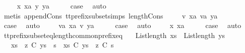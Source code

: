 \begin{isabellebody}
\isamarkupfalse%
\isanewline
\ \ \isamarkupfalse%
\ {\isacharparenleft}{}\ x\ xa\ y\ ya{\isacharparenright}\isanewline
\ \ \isamarkupfalse%
\ \isamarkupfalse%
\ {\isacharquery}case\ \isamarkupfalse%
\ auto\isanewline
\ \ \ \ \isamarkupfalse%
\ {\isacharparenleft}metis\ append{\isacharunderscore}Cons\ tt{\isacharunderscore}prefix{\isacharunderscore}subset{\isachardot}simps{\isacharparenleft}{}{\isacharparenright}\ length{\isacharunderscore}Cons{\isacharparenright}\isanewline
{}\isamarkupfalse%
\isanewline
\ \ \isamarkupfalse%
\ {\isacharparenleft}{\isachardoublequoteopen}{}{\isacharunderscore}{}{\isachardoublequoteclose}\ v\ xa\ va\ ya{\isacharparenright}\isanewline
\ \ \isamarkupfalse%
\ \isamarkupfalse%
\ {\isacharquery}case\ \isamarkupfalse%
\ auto\isanewline
{}\isamarkupfalse%
\isanewline
\ \ \isamarkupfalse%
\ {\isacharparenleft}{\isachardoublequoteopen}{}{\isacharunderscore}{}{\isachardoublequoteclose}\ va\ xa\ v\ ya{\isacharparenright}\isanewline
\ \ \isamarkupfalse%
\ \isamarkupfalse%
\ {\isacharquery}case\ \isamarkupfalse%
\ auto\isanewline
{}\isamarkupfalse%
\isanewline
\ \ \isamarkupfalse%
\ {\isacharparenleft}{}\ x\ xa{\isacharparenright}\isanewline
\ \ \isamarkupfalse%
\ \isamarkupfalse%
\ {\isacharquery}case\ \isamarkupfalse%
\ auto\isanewline
{}\isamarkupfalse%
%
\endisatagproof
{\isafoldproof}%
%
\isadelimproof
\isanewline
%
\endisadelimproof
\isanewline
{}\isamarkupfalse%
\ tt{\isacharunderscore}prefix{\isacharunderscore}subset{\isacharunderscore}eq{\isacharunderscore}length{\isacharunderscore}common{\isacharunderscore}prefix{\isacharunderscore}eq{\isacharcolon}\isanewline
\ \ \ {\isachardoublequoteopen}List{\isachardot}length\ xs\ {\isacharequal}\ List{\isachardot}length\ ys{\isachardoublequoteclose}\isanewline
\ \ \ {\isachardoublequoteopen}{\isacharparenleft}{\isacharparenleft}xs\ {\isacharat}\ z{\isacharparenright}\ {\isasymlesssim}\isactrlsub C\ {\isacharparenleft}ys\ {\isacharat}\ s{\isacharparenright}{\isacharparenright}\ {\isacharequal}\ {\isacharparenleft}xs\ {\isasymlesssim}\isactrlsub C\ ys\ {\isasymand}\ z\ {\isasymlesssim}\isactrlsub C\ s{\isacharparenright}{\isachardoublequoteclose}\isanewline

\end{isabellebody}

